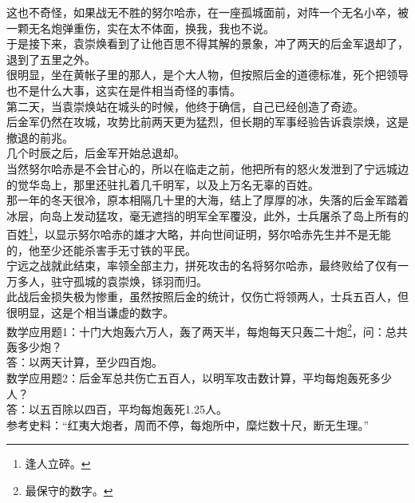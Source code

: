 \begin{multicols}{\theparacolNo}
这也不奇怪，如果战无不胜的努尔哈赤，在一座孤城面前，对阵一个无名小卒，被一颗无名炮弹重伤，实在太不体面，换我，我也不说。\\

于是接下来，袁崇焕看到了让他百思不得其解的景象，冲了两天的后金军退却了，退到了五里之外。\\

很明显，坐在黄帐子里的那人，是个大人物，但按照后金的道德标准，死个把领导也不是什么大事，这实在是件相当奇怪的事情。\\

第二天，当袁崇焕站在城头的时候，他终于确信，自己已经创造了奇迹。\\

后金军仍然在攻城，攻势比前两天更为猛烈，但长期的军事经验告诉袁崇焕，这是撤退的前兆。\\

几个时辰之后，后金军开始总退却。\\

当然努尔哈赤是不会甘心的，所以在临走之前，他把所有的怒火发泄到了宁远城边的觉华岛上，那里还驻扎着几千明军，以及上万名无辜的百姓。\\

那一年的冬天很冷，原本相隔几十里的大海，结上了厚厚的冰，失落的后金军踏着冰层，向岛上发动猛攻，毫无遮挡的明军全军覆没，此外，士兵屠杀了岛上所有的百姓\footnote{逢人立碎。}，以显示努尔哈赤的雄才大略，并向世间证明，努尔哈赤先生并不是无能的，他至少还能杀害手无寸铁的平民。\\

宁远之战就此结束，率领全部主力，拼死攻击的名将努尔哈赤，最终败给了仅有一万多人，驻守孤城的袁崇焕，铩羽而归。\\

此战后金损失极为惨重，虽然按照后金的统计，仅伤亡将领两人，士兵五百人，但很明显，这是个相当谦虚的数字。\\

数学应用题1：十门大炮轰六万人，轰了两天半，每炮每天只轰二十炮\footnote{最保守的数字。}，问：总共轰多少炮？\\

答：以两天计算，至少四百炮。\\

数学应用题2：后金军总共伤亡五百人，以明军攻击数计算，平均每炮轰死多少人？\\

答：以五百除以四百，平均每炮轰死1.25人。\\

参考史料：“红夷大炮者，周而不停，每炮所中，糜烂数十尺，断无生理。”\\


\end{multicols}
